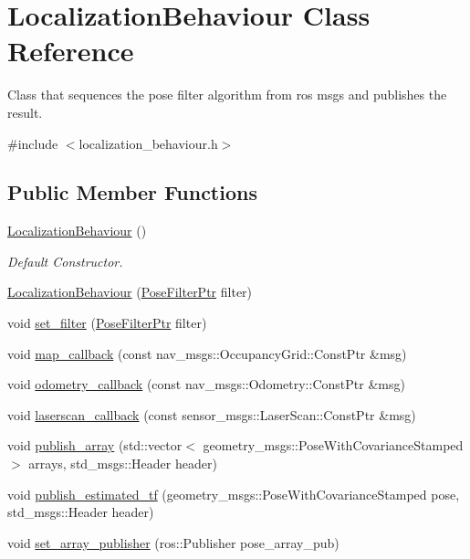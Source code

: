 \hypertarget{classLocalizationBehaviour}{\section{Localization\-Behaviour Class Reference}
\label{classLocalizationBehaviour}
}


Class that sequences the pose filter algorithm from ros msgs and publishes the result.  




{\ttfamily \#include $<$localization\-\_\-behaviour.\-h$>$}

\subsection*{Public Member Functions}
\begin{DoxyCompactItemize}
\item 
\hypertarget{classLocalizationBehaviour_a8fbdf12412fc69f2eed036a3d003c808}{\hyperlink{classLocalizationBehaviour_a8fbdf12412fc69f2eed036a3d003c808}{Localization\-Behaviour} ()}\label{classLocalizationBehaviour_a8fbdf12412fc69f2eed036a3d003c808}

\begin{DoxyCompactList}\small\item\em Default Constructor. \end{DoxyCompactList}\item 
\hyperlink{classLocalizationBehaviour_a4214dad5f0576a7d4d386476c35a00cc}{Localization\-Behaviour} (\hyperlink{pose__filter_8h_a9df59d7c2f322f00bdd8eccab6d3fd73}{Pose\-Filter\-Ptr} filter)
\item 
void \hyperlink{classLocalizationBehaviour_a3f7e87ea9de49757cf61624d3cb38289}{set\-\_\-filter} (\hyperlink{pose__filter_8h_a9df59d7c2f322f00bdd8eccab6d3fd73}{Pose\-Filter\-Ptr} filter)
\item 
void \hyperlink{classLocalizationBehaviour_a71f26956851efb42ec0d41f67d5fb744}{map\-\_\-callback} (const nav\-\_\-msgs\-::\-Occupancy\-Grid\-::\-Const\-Ptr \&msg)
\item 
void \hyperlink{classLocalizationBehaviour_a6d66815f5aaf22643a4b6ddc2a406f7d}{odometry\-\_\-callback} (const nav\-\_\-msgs\-::\-Odometry\-::\-Const\-Ptr \&msg)
\item 
void \hyperlink{classLocalizationBehaviour_aca2be6938ff49e7c2d6701fabe8612f3}{laserscan\-\_\-callback} (const sensor\-\_\-msgs\-::\-Laser\-Scan\-::\-Const\-Ptr \&msg)
\item 
void \hyperlink{classLocalizationBehaviour_aeba3e969c5065fbdaa8358b697a125d8}{publish\-\_\-array} (std\-::vector$<$ geometry\-\_\-msgs\-::\-Pose\-With\-Covariance\-Stamped $>$ arrays, std\-\_\-msgs\-::\-Header header)
\item 
void \hyperlink{classLocalizationBehaviour_aef0b0f4bd1c23b8dd7ce8bb544b2a9d8}{publish\-\_\-estimated\-\_\-tf} (geometry\-\_\-msgs\-::\-Pose\-With\-Covariance\-Stamped pose, std\-\_\-msgs\-::\-Header header)
\item 
void \hyperlink{classLocalizationBehaviour_ac6180e3b8ac4fc8497d92d99acb8726f}{set\-\_\-array\-\_\-publisher} (ros\-::\-Publisher pose\-\_\-array\-\_\-pub)
\end{DoxyCompactItemize}


